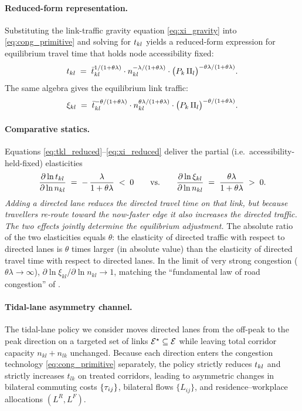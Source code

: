 \paragraph{Reduced-form representation.}
Substituting the link-traffic gravity equation \eqref{eq:xi_gravity}
into \eqref{eq:cong_primitive} and solving for $t_{kl}$ yields a
reduced-form expression for equilibrium travel time that holds node
accessibility fixed:
\begin{equation}
  t_{kl}
  \;=\;
  \bar t_{kl}^{1/(1+\theta\lambda)}\cdot
  n_{kl}^{-\lambda/(1+\theta\lambda)}\cdot
  \bigl(P_k\,\Pi_l\bigr)^{-\theta\lambda/(1+\theta\lambda)}.
  \label{eq:tkl_reduced}
\end{equation}
The same algebra gives the equilibrium link traffic:
\begin{equation}
  \xi_{kl}
  \;=\;
  \bar t_{kl}^{-\theta/(1+\theta\lambda)}\cdot
  n_{kl}^{\theta\lambda/(1+\theta\lambda)}\cdot
  \bigl(P_k\,\Pi_l\bigr)^{-\theta/(1+\theta\lambda)}.
  \label{eq:xi_reduced}
\end{equation}

\paragraph{Comparative statics.}
Equations \eqref{eq:tkl_reduced}--\eqref{eq:xi_reduced} deliver the
partial (i.e.\ accessibility-held-fixed) elasticities
\begin{equation}
  \frac{\partial\ln t_{kl}}{\partial\ln n_{kl}}
  \;=\;-\,\frac{\lambda}{1+\theta\lambda}\;<\;0
  \qquad\text{vs.}\qquad
  \frac{\partial\ln\xi_{kl}}{\partial\ln n_{kl}}
  \;=\;\frac{\theta\lambda}{1+\theta\lambda}\;>\;0.
  \label{eq:elasticities}
\end{equation}
\emph{Adding a directed lane reduces the directed travel time on that
link, but because travellers re-route toward the now-faster edge it
also increases the directed traffic.  The two effects jointly
determine the equilibrium adjustment.}  The absolute ratio of the
two elasticities equals $\theta$: the elasticity of directed
traffic with respect to directed lanes is $\theta$ times larger
(in absolute value) than the elasticity of directed travel time
with respect to directed lanes.  In the limit of very strong
congestion ($\theta\lambda\to\infty$), $\partial\ln\xi_{kl}/
\partial\ln n_{kl}\to 1$, matching the ``fundamental law of road
congestion'' of \cite{DurantonTurner2011}.

\paragraph{Tidal-lane asymmetry channel.}
The tidal-lane policy we consider moves directed lanes from the
off-peak to the peak direction on a targeted set of links
$\mathcal E^\star\subseteq\mathcal E$ while leaving total corridor capacity
$n_{kl}+n_{lk}$ unchanged.  Because each direction enters the
congestion technology \eqref{eq:cong_primitive} separately, the
policy strictly reduces $t_{kl}$ and strictly increases $t_{lk}$ on
treated corridors, leading to asymmetric changes in bilateral
commuting costs $\{\tau_{ij}\}$, bilateral flows $\{L_{ij}\}$, and
residence--workplace allocations $(L^R,L^F)$.

